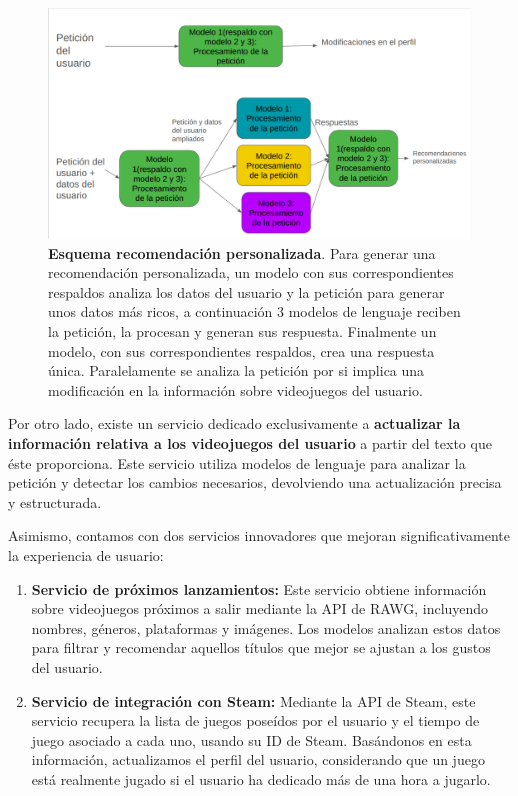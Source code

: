 \begin{figure}[H]
	\centering
	\includegraphics[width=1\linewidth]{imagenes/esquemaRecomendacionPersonalizada.png}
	\caption[\textbf{Esquema recomendación personalizada}.]{\textbf{Esquema recomendación personalizada}. Para generar una recomendación personalizada, un modelo con sus correspondientes respaldos analiza los datos del usuario y la petición para generar unos datos más ricos, a continuación 3 modelos de lenguaje reciben la petición, la procesan y generan sus respuesta. Finalmente un modelo, con sus correspondientes respaldos, crea una respuesta única. Paralelamente se analiza la petición por si implica una modificación en la información sobre videojuegos del usuario.}
	\label{esquemaRB}
\end{figure}

Por otro lado, existe un servicio dedicado exclusivamente a \textbf{actualizar la información relativa a los videojuegos del usuario} a partir del texto que éste proporciona. Este servicio utiliza modelos de lenguaje para analizar la petición y detectar los cambios necesarios, devolviendo una actualización precisa y estructurada.

Asimismo, contamos con dos servicios innovadores que mejoran significativamente la experiencia de usuario:

\begin{enumerate}
	\item \textbf{Servicio de próximos lanzamientos:} Este servicio obtiene información sobre videojuegos próximos a salir mediante la API de RAWG, incluyendo nombres, géneros, plataformas y imágenes. Los modelos analizan estos datos para filtrar y recomendar aquellos títulos que mejor se ajustan a los gustos del usuario.
	\item \textbf{Servicio de integración con Steam:} Mediante la API de Steam, este servicio recupera la lista de juegos poseídos por el usuario y el tiempo de juego asociado a cada uno, usando su ID de Steam. Basándonos en esta información, actualizamos el perfil del usuario, considerando que un juego está realmente jugado si el usuario ha dedicado más de una hora a jugarlo.
\end{enumerate}

